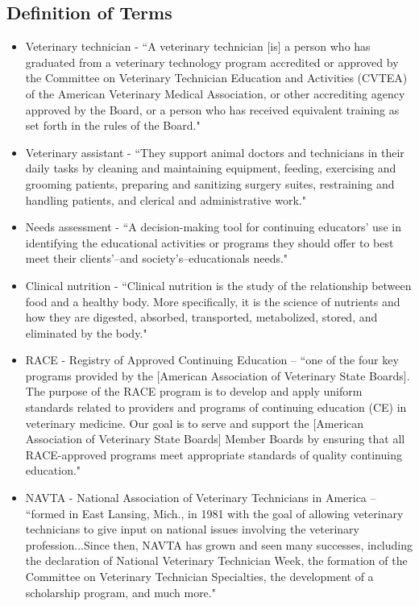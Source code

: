 \subsection{Definition of Terms}
\begin{itemize}
    \item Veterinary technician - ``A veterinary technician [is] a person who has graduated from a veterinary technology program accredited or approved by the Committee on Veterinary Technician Education and Activities (CVTEA) of the American Veterinary Medical Association, or other accrediting agency approved by the Board, or a person who has received equivalent training as set forth in the rules of the Board." \citep{idaho}
    \item Veterinary assistant - ``They support animal doctors and technicians in their daily tasks by cleaning and maintaining equipment, feeding, exercising and grooming patients, preparing and sanitizing surgery suites, restraining and handling patients, and clerical and administrative work."\citep{allied}
    \item Needs assessment - ``A decision-making tool for continuing educators' use in identifying the educational activities or programs they should offer to best meet their clients'--and society's--educationals needs."\citep{queeney}
    \item Clinical nutrition - ``Clinical nutrition is the study of the relationship between food and a healthy body. More specifically, it is the science of nutrients and how they are digested, absorbed, transported, metabolized, stored, and eliminated by the body."\citep{umm}
    \item RACE - Registry of Approved Continuing Education -- ``one of the four key programs provided by the [American Association of Veterinary State Boards]. The purpose of the RACE program is to develop and apply uniform standards related to providers and programs of continuing education (CE) in veterinary medicine. Our goal is to serve and support the [American Association of Veterinary State Boards] Member Boards by ensuring that all RACE-approved programs meet appropriate standards of quality continuing education."\citep{race}
    \item NAVTA - National Association of Veterinary Technicians in America -- ``formed in East Lansing, Mich., in 1981 with the goal of allowing veterinary technicians to give input on national issues involving the veterinary profession...Since then, NAVTA has grown and seen many successes, including the declaration of National Veterinary Technician Week, the formation of the Committee on Veterinary Technician Specialties, the development of a scholarship program, and much more."\citep{navta}

\end{itemize}
